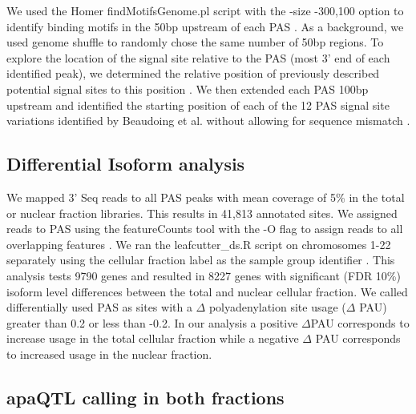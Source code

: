 We used the Homer findMotifsGenome.pl script  with the -size -300,100  option to identify binding motifs in the 50bp upstream of each PAS \citep{heinz_simple_2010}. As a background, we used genome shuffle to randomly chose the same number of 50bp regions. To explore the location of the signal site relative to the PAS (most 3' end of each identified peak), we determined the relative position of previously described potential signal sites to this position \citep{beaudoing_patterns_2000}. We then extended each PAS 100bp upstream and identified the starting position of each of the 12 PAS signal site variations identified by Beaudoing et al. without allowing for sequence mismatch  \citep{beaudoing_patterns_2000}. 


\subsection{Differential Isoform analysis}\label{Differential-Isoform-analysis}

We mapped 3' Seq reads to all PAS peaks with mean coverage of 5\% in the total or nuclear fraction libraries. This results in 41,813 annotated sites. We assigned reads to PAS using the featureCounts tool with the -O flag to assign reads to all overlapping features \citep{liao_featurecounts_2014}. We ran the leafcutter\_ds.R script on chromosomes 1-22 separately using the cellular fraction label as the sample group identifier \citep{li_annotation-free_2018}.  This analysis tests 9790 genes and resulted in 8227 genes with significant (FDR 10\%) isoform level differences between the total and nuclear cellular fraction. We called differentially used PAS as sites with a $\Delta$ polyadenylation site usage ($\Delta$ PAU) greater than 0.2 or less than -0.2. In our analysis a positive $\Delta$PAU corresponds to increase usage in the total cellular fraction while a negative $\Delta$ PAU corresponds to increased usage in the nuclear fraction. 

\subsection{apaQTL calling in both fractions}\label{apaQTL-calling-in-both-fractions}

